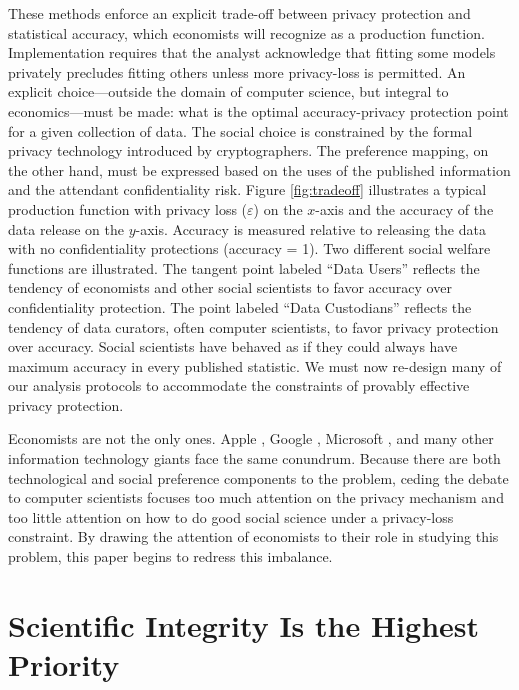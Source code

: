 

These methods enforce an explicit trade-off between privacy protection and statistical accuracy, which economists will recognize as a production function. Implementation requires that the analyst acknowledge that fitting some models privately precludes fitting others unless more privacy-loss is permitted.
An explicit choice---outside the domain of computer science, but integral to economics---must be made: what is the optimal accuracy-privacy protection point for a given collection of data. The social choice is constrained by the formal privacy technology introduced by cryptographers. The preference mapping, on the other hand, must be expressed based on the uses of the published information and the attendant confidentiality risk.
Figure \ref{fig:tradeoff} illustrates a typical production function with privacy loss ($\varepsilon$) on the $x$-axis and the accuracy of the data release on the $y$-axis. Accuracy is measured relative to releasing the data with no confidentiality protections (accuracy = 1). Two different social welfare functions are illustrated. The tangent point labeled ``Data Users'' reflects the tendency of economists and other social scientists to favor accuracy over confidentiality protection. The point labeled ``Data Custodians'' reflects the tendency of data curators, often computer scientists, to favor privacy protection over accuracy. Social scientists have behaved as if they could always have maximum accuracy in every published statistic. We must now re-design many of our analysis protocols to accommodate the constraints of provably effective privacy protection.


Economists are not the only ones. Apple \citep{Apple:Learning:2017}, Google \citep{Erlingsson2014},  Microsoft \citep{Ding:Telemetry:NIPS:2017}, and many other information technology giants face the same conundrum. Because there are both technological and social preference components to the problem, ceding the debate to computer scientists focuses too much attention on the privacy mechanism and too little attention on how to do good social science under a privacy-loss constraint. By drawing the attention of economists to their role in studying this problem, this paper begins to redress this imbalance.

\section{Scientific Integrity Is the Highest Priority}

